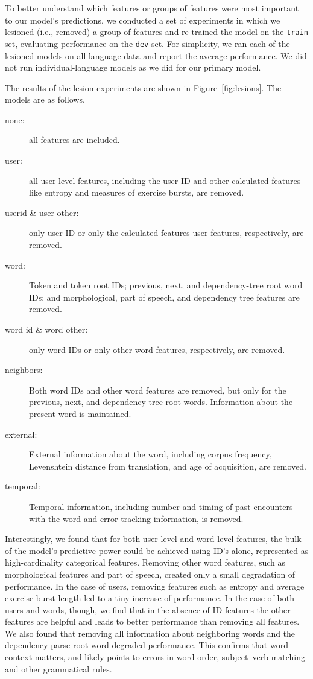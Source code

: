 \documentclass[11pt,a4paper]{article}
\begin{document}
To better understand which features or groups of features were most important to
our model's predictions, we conducted a set of experiments in which we lesioned
(i.e., removed) a group of features and re-trained the model on the {\tt train}
set, evaluating performance on the {\tt dev} set. For simplicity, we ran each of the
lesioned models on all language data and report the average
performance. We did not run individual-language models as we did for our primary model.

The results of the lesion experiments are shown in Figure~\ref{fig:lesions}. The
models are as follows.
\begin{description}
  \item[none:] all features are included.  
  \item[user:] all user-level features, including the user ID and other
    calculated features like entropy and measures of exercise bursts, are
    removed.
  \item[userid \& user other:] only user ID or only the calculated
    features user features, respectively, are removed.
  \item[word:] Token and token root IDs; previous, next, and dependency-tree
    root word IDs; and morphological, part of speech, and dependency tree
    features are removed.
  \item[word id \& word other:] only word IDs or only other
    word features, respectively, are removed.
  \item[neighbors:] Both word IDs and other word features are removed, but
    only for the previous, next, and dependency-tree root words. Information
    about the present word is maintained.
  \item[external:] External information about the word, including corpus
    frequency, Levenshtein distance from translation, and age of acquisition,
    are removed.
  \item[temporal:] Temporal information, including number and timing of
    past encounters with the word and error tracking information, is removed.
\end{description}

Interestingly, we found that for both user-level and word-level features, the
bulk of the model's predictive power could be achieved using ID's alone,
represented as high-cardinality categorical features. Removing other word features,
such as morphological features and part of speech, created only a small
degradation of performance. In the case of users, removing features such as
entropy and average exercise burst length led to a tiny increase of performance.
In the case of both users and words, though, we find that in the absence of ID
features the other features are helpful and leads to better performance than
removing all features. We also found that removing all information about
neighboring words and the dependency-parse root word degraded performance. This
confirms that word context matters, and likely points to errors in word order,
subject--verb matching and other grammatical rules.
\end{document}
